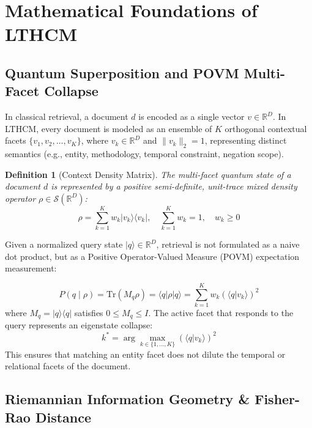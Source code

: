 \documentclass[11pt,a4paper]{article}
\newtheorem{definition}{Definition}
\begin{document}
\section{Mathematical Foundations of LTHCM}

\subsection{Quantum Superposition and POVM Multi-Facet Collapse}

In classical retrieval, a document $d$ is encoded as a single vector $v \in \mathbb{R}^D$. In LTHCM, every document is modeled as an ensemble of $K$ orthogonal contextual facets $\{v_1, v_2, \dots, v_K\}$, where $v_k \in \mathbb{R}^D$ and $\|v_k\|_2 = 1$, representing distinct semantics (e.g., entity, methodology, temporal constraint, negation scope).

\begin{definition}[Context Density Matrix]
The multi-facet quantum state of a document $d$ is represented by a positive semi-definite, unit-trace mixed density operator $\rho \in \mathcal{S}(\mathbb{R}^D)$:
\begin{equation}
    \rho = \sum_{k=1}^K w_k |v_k\rangle\langle v_k|, \quad \sum_{k=1}^K w_k = 1, \quad w_k \ge 0
\end{equation}
\end{definition}

Given a normalized query state $|q\rangle \in \mathbb{R}^D$, retrieval is not formulated as a naive dot product, but as a Positive Operator-Valued Measure (POVM) expectation measurement:

\begin{equation}
    P(q \mid \rho) = \mathrm{Tr}\left( M_q \rho \right) = \langle q | \rho | q \rangle = \sum_{k=1}^K w_k \left( \langle q | v_k \rangle \right)^2
\end{equation}
where $M_q = |q\rangle\langle q|$ satisfies $0 \le M_q \le I$. The active facet that responds to the query represents an eigenstate collapse:
\begin{equation}
    k^* = \arg\max_{k \in \{1,\dots,K\}} \left( \langle q | v_k \rangle \right)^2
\end{equation}
This ensures that matching an entity facet does not dilute the temporal or relational facets of the document.

\subsection{Riemannian Information Geometry \& Fisher-Rao Distance}
\end{document}
